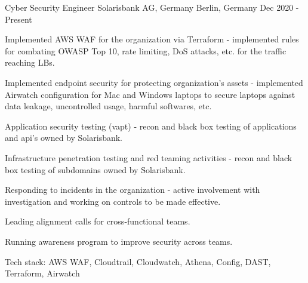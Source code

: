 
\begin{cventries}

\cventry
    {Cyber Security Engineer} %
    {Solarisbank AG, Germany} %
    {Berlin, Germany} %
    {Dec 2020 - Present} %
    {
      \begin{cvitems} %
        \item {Implemented AWS WAF for the organization via Terraform - implemented rules for combating OWASP Top 10, rate limiting, DoS attacks, etc. for the traffic reaching LBs.}
        \item {Implemented endpoint security for protecting organization's assets - implemented Airwatch configuration for Mac and Windows laptops to secure laptops against data leakage, uncontrolled usage, harmful softwares, etc.}
        \item {Application security testing (vapt) - recon and black box testing of applications and api's owned by Solarisbank.}
        \item {Infrastructure penetration testing and red teaming activities  - recon and black box testing of subdomains owned by Solarisbank.}
        \item {Responding to incidents in the organization - active involvement with investigation and working on controls to be made effective.}
        \item {Leading alignment calls for cross-functional teams.}
        \item {Running awareness program to improve security across teams.}
        \item {Tech stack: AWS WAF, Cloudtrail, Cloudwatch, Athena, Config, DAST, Terraform, Airwatch}
      \end{cvitems}
    }


\end{cventries}
